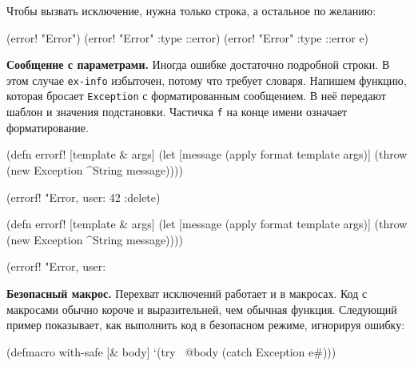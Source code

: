 \fi

\noindent
Чтобы вызвать исключение, нужна только строка, а остальное по желанию:

\begin{english}
  \begin{clojure}
(error! "Error")
(error! "Error" {:type ::error})
(error! "Error" {:type ::error} e)
  \end{clojure}
\end{english}

\textbf{Сообщение с параметрами.} Иногда ошибке достаточно подробной строки. В
этом случае \verb|ex-info| избыточен, потому что требует словаря. Напишем
функцию, которая бросает \verb|Exception| с форматированным сообщением. В
неё передают шаблон и значения подстановки. Частичка \verb|f| на конце
имени означает форматирование.


\ifx\devicetype\mobile

\begin{english}
  \begin{clojure}
(defn errorf! [template & args]
  (let [message (apply format
                  template args)]
    (throw (new Exception
             ^String message))))

(errorf! "Error, user: %
  42 :delete)
  \end{clojure}
\end{english}

\else

\begin{english}
  \begin{clojure}
(defn errorf! [template & args]
  (let [message (apply format template args)]
    (throw (new Exception ^String message))))

(errorf! "Error, user: %
  \end{clojure}
\end{english}

\fi

\textbf{Безопасный макрос.} Перехват исключений работает и в макросах. Код с
макросами обычно короче и выразительней, чем обычная функция. Следующий пример
показывает, как выполнить код в безопасном режиме, игнорируя ошибку:


\begin{english}
  \begin{clojure}
(defmacro with-safe [& body]
  `(try
     ~@body
     (catch Exception e#)))
  \end{clojure}
\end{english}

